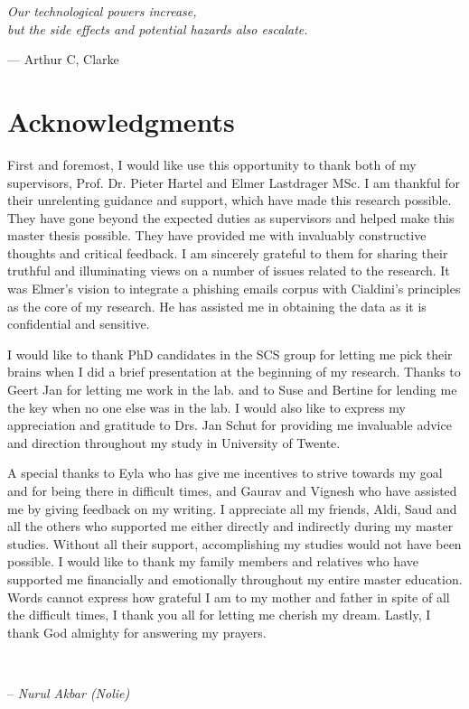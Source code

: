 
\begin{flushright}
\textsl{Our technological powers increase, }\\
\textsl{but the side effects and potential hazards also escalate.}\\

\par\end{flushright}

\begin{flushright}
\medskip{}
 --- Arthur C, Clarke
\par\end{flushright}

\bigskip{}


\begingroup
\let\clearpage\relax
\let\cleardoublepage\relax 


\chapter*{Acknowledgments}

First and foremost, I would like use this opportunity to thank both
of my supervisors, Prof. Dr. Pieter Hartel and Elmer Lastdrager MSc.
I am thankful for their unrelenting guidance and support, which have
made this research possible. They have gone beyond the expected duties
as supervisors and helped make this master thesis possible. They have
provided me with invaluably constructive thoughts and critical feedback.
I am sincerely grateful to them for sharing their truthful and illuminating
views on a number of issues related to the research. It was Elmer's
vision to integrate a phishing emails corpus with Cialdini's principles
as the core of my research. He has assisted me in obtaining the data
as it is confidential and sensitive. 

I would like to thank PhD candidates in the SCS group for letting
me pick their brains when I did a brief presentation at the beginning
of my research. Thanks to Geert Jan for letting me work in the lab.
and to Suse and Bertine for lending me the key when no one else was
in the lab. I would also like to express my appreciation and gratitude
to Drs. Jan Schut for providing me invaluable advice and direction
throughout my study in University of Twente. 

A special thanks to Eyla who has give me incentives to strive towards
my goal and for being there in difficult times, and Gaurav and Vignesh
who have assisted me by giving feedback on my writing. I appreciate
all my friends, Aldi, Saud and all the others who supported me either
directly and indirectly during my master studies. Without all their
support, accomplishing my studies would not have been possible. I
would like to thank my family members and relatives who have supported
me financially and emotionally throughout my entire master education.
Words cannot express how grateful I am to my mother and father in
spite of all the difficult times, I thank you all for letting me cherish
my dream. Lastly, I thank God almighty for answering my prayers.

\ 

-- \textsl{Nurul Akbar (Nolie)}

\endgroup
